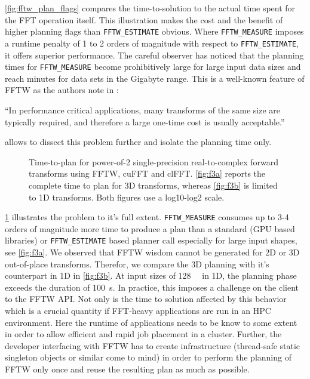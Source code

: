\cref{fig:fftw_plan_flags} compares the time-to-solution to the actual time spent for the FFT operation itself. This illustration makes the cost and the benefit of higher planning flags than \texttt{FFTW\_ESTIMATE} obvious. Where \texttt{FFTW\_MEASURE} imposes a runtime penalty of 1 to 2 orders of magnitude with respect to \texttt{FFTW\_ESTIMATE}, it offers superior performance. The careful observer has noticed that the planning times for \texttt{FFTW\_MEASURE} become prohibitively large for large input data sizes and reach minutes for data sets in the Gigabyte range. This is a well-known feature of FFTW as the authors note in \cite{FFTW05}:

\begin{center}
  ``In performance critical applications, many transforms of the same
  size are typically required, and therefore a large one-time cost is
  usually acceptable.''
\end{center}
 
\gearshifft{} allows to dissect this problem further and isolate the planning time only.

\begin{figure}[!tbp]
  \centering
  \hfill
  \caption{Time-to-plan for power-of-2 single-precision real-to-complex forward transforms using FFTW, cuFFT and clFFT. \cref{fig:f3a} reports the complete time to plan for 3D transforms, whereas \cref{fig:f3b} is limited to 1D transforms. Both figures use a log10-log2 scale.}
  \label{fig:plan_time_only}
\end{figure}

\cref{fig:plan_time_only} illustrates the problem to it's full extent. \texttt{FFTW\_MEASURE} consumes up to 3-4 orders of magnitude more time to produce a plan than a standard (GPU based libraries) or \texttt{FFTW\_ESTIMATE} based planner call especially for large input shapes, see \cref{fig:f3a}. We observed that FFTW wisdom cannot be generated for 2D or 3D out-of-place transforms. Therefor, we compare the 3D planning with it's counterpart in 1D in \cref{fig:f3b}. At input sizes of \SI{128}{\mebi\byte} in 1D, the planning phase exceeds the duration of \SI{100}{\second}. In practice, this imposes a challenge on the client to the FFTW API. Not only is the time to solution affected by this behavior which is a crucial quantity if FFT-heavy applications are run in an HPC environment. Here the runtime of applications needs to be know to some extent in order to allow efficient and rapid job placement in a cluster. Further, the developer interfacing with FFTW has to create infrastructure (thread-safe static singleton objects or similar come to mind) in order to perform the planning of FFTW only once and reuse the resulting plan as much as possible.

